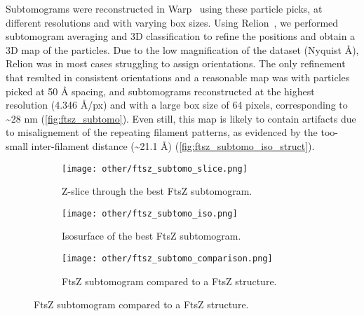 Subtomograms were reconstructed in Warp~\cite{tegunovRealtimeCryoelectronMicroscopy2019} using these particle picks, at different resolutions and with varying box sizes.
Using Relion~\cite{scheresRELIONImplementationBayesian2012,zivanovBayesianApproachSingleparticle2022,burtImageProcessingPipeline2024}, we performed subtomogram averaging and 3D classification to refine the positions and obtain a 3D map of the particles.
Due to the low magnification of the dataset (Nyquist  Å), Relion was in most cases struggling to assign orientations.
The only refinement that resulted in consistent orientations and a reasonable map was with particles picked at 50 Å spacing, and subtomograms reconstructed at the highest resolution (4.346 Å/px) and with a large box size of 64 pixels, corresponding to \sim28 nm (\autoref{fig:ftsz_subtomo}).
Even still, this map is likely to contain artifacts due to misalignement of the repeating filament patterns, as evidenced by the too-small inter-filament distance (\sim21.1 Å) (\autoref{fig:ftsz_subtomo_iso_struct}).

\begin{figure}
    \centering
    \begin{subfigure}[B]{.32\textwidth}
        \centering
        \texttt{[image: other/ftsz\_subtomo\_slice.png]}
        \caption{Z-slice through the best FtsZ subtomogram.}
        \label{fig:ftsz_subtomo_slice}
    \end{subfigure}%
    \hfill
    \begin{subfigure}[B]{.32\textwidth}
        \centering
        \texttt{[image: other/ftsz\_subtomo\_iso.png]}
        \caption{Isosurface of the best FtsZ subtomogram.}
        \label{fig:ftsz_subtomo_iso}
    \end{subfigure}%
    \hfill
    \begin{subfigure}[B]{.32\textwidth}
        \centering
        \texttt{[image: other/ftsz\_subtomo\_comparison.png]}
        \caption{FtsZ subtomogram compared to a FtsZ structure.}
        \label{fig:ftsz_subtomo_iso_struct}
    \end{subfigure}%
    \label{fig:ftsz_subtomo}
\end{figure}

